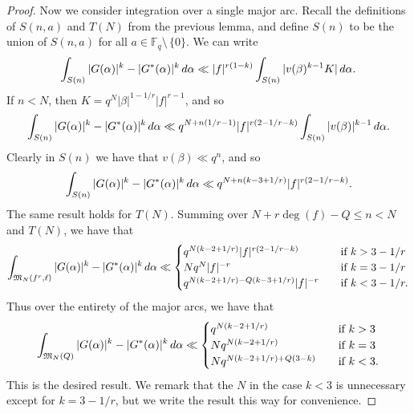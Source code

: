 \documentclass[10pt,a4paper]{amsart}
\def\F{{\mathbb F}}\def\N{{\mathbb N}}\def\P{{\mathbb P}}
\def\grM{{\mathfrak M}}\def\grN{{\mathfrak N}}
\def\setmin{{\setminus\!\,}}
\renewcommand{\d}{\,{\rm d}} %
\begin{document}
\begin{proof}
    Now we consider integration over a single major arc. Recall the definitions of $S(n,a)$ and $T(N)$ from the previous lemma, and define $S(n)$ to be the union of $S(n,a)$ for all $a \in \F_q\setmin\{0\}$. We can write
    \[\int_{S(n)} |G(\alpha)|^k -  |G^*(\alpha)|^k \d\alpha \ll |f|^{r(1-k)}\int_{S(n)} |v(\beta)^{k-1}K| \d\alpha.\]
    If $n<N$, then $K = q^N|\beta|^{1-1/r}|f|^{r-1}$, and so 
    \[\int_{S(n)} |G(\alpha)|^k -  |G^*(\alpha)|^k \d\alpha \ll q^{N+n(1/r-1)}|f|^{r(2-1/r-k)}\int_{S(n)} |v(\beta)|^{k-1} \d\alpha.\]
    Clearly in $S(n)$ we have that $v(\beta) \ll q^n$, and so 
    \[\int_{S(n)} |G(\alpha)|^k -  |G^*(\alpha)|^k \d\alpha \ll q^{N+n(k-3+1/r)}|f|^{r(2-1/r-k)}.\]
    The same result holds for $T(N)$. Summing over $N+r\deg(f)-Q \leq n < N$ and $T(N)$, we have that
    \[\int_{\grM_N(f^r,\ell)} |G(\alpha)|^k -  |G^*(\alpha)|^k \d\alpha \ll \begin{cases}
        q^{N(k-2+1/r)}|f|^{r(2-1/r-k)} \quad &\text{if } k>3-1/r \\
        Nq^N|f|^{-r} \quad &\text{if } k=3-1/r \\
        q^{N(k-2+1/r)-Q(k-3+1/r)}|f|^{-r} \quad &\text{if } k < 3-1/r.
    \end{cases}\]
    Thus over the entirety of the major arcs, we have that
    \[\int_{\grM_N(Q)} |G(\alpha)|^k -  |G^*(\alpha)|^k \d\alpha \ll \begin{cases}
        q^{N(k-2+1/r)} \quad &\text{if } k>3 \\
        Nq^{N(k-2+1/r)} \quad &\text{if } k=3 \\
        Nq^{N(k-2+1/r) + Q(3-k)} \quad &\text{if } k < 3.
    \end{cases}\]
    This is the desired result. We remark that the $N$ in the case $k<3$ is unnecessary except for $k=3-1/r$, but we write the result this way for convenience.
\end{proof}
\end{document}
